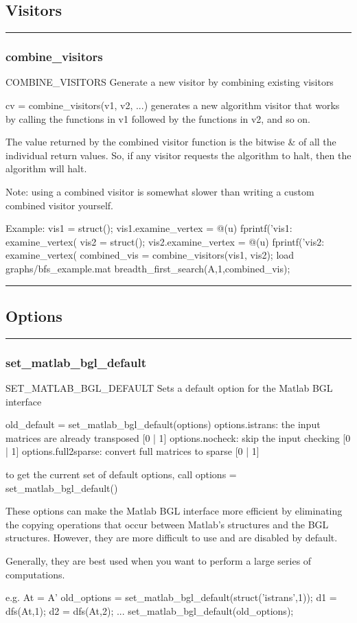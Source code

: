 \subsection*{Visitors}
\vspace{1cm}
\hrule
\subsubsection*{combine\_visitors}
\begin{mcode}
  COMBINE_VISITORS Generate a new visitor by combining existing visitors
 
  cv = combine_visitors(v1, v2, ...) generates a new algorithm visitor that
  works by calling the functions in v1 followed by the functions in v2, and
  so on.  
 
  The value returned by the combined visitor function is the bitwise & of
  all the individual return values.  So, if any visitor requests the
  algorithm to halt, then the algorithm will halt.
 
  Note: using a combined visitor is somewhat slower than writing a custom
  combined visitor yourself.
 
  Example:
     vis1 = struct();
     vis1.examine_vertex = @(u) fprintf('vis1: examine_vertex(%
     vis2 = struct();
     vis2.examine_vertex = @(u) fprintf('vis2: examine_vertex(%
     combined_vis = combine_visitors(vis1, vis2);
     load graphs/bfs_example.mat
     breadth_first_search(A,1,combined_vis);
\end{mcode}
\newpage
\hrule
\subsection*{Options}
\vspace{1cm}
\hrule
\subsubsection*{set\_matlab\_bgl\_default}
\begin{mcode}
  SET_MATLAB_BGL_DEFAULT Sets a default option for the Matlab BGL interface
 
  old_default = set_matlab_bgl_default(options)
  options.istrans: the input matrices are already transposed [{0} | 1]
  options.nocheck: skip the input checking [{0} | 1]
  options.full2sparse: convert full matrices to sparse [{0} | 1]
 
  to get the current set of default options, call
  options = set_matlab_bgl_default()
 
  These options can make the Matlab BGL interface more efficient by
  eliminating the copying operations that occur between Matlab's structures
  and the BGL structures.  However, they are more difficult to use and are
  disabled by default.
 
  Generally, they are best used when you want to perform a large series of
  computations.
 
  e.g.
  At = A'
  old_options = set_matlab_bgl_default(struct('istrans',1));
  d1 = dfs(At,1); d2 = dfs(At,2); ...
  set_matlab_bgl_default(old_options);
\end{mcode}
